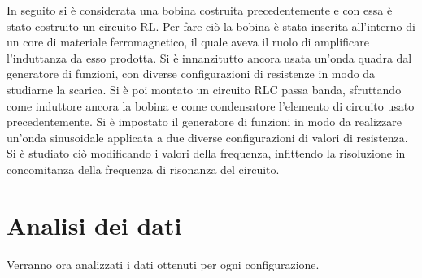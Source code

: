\documentclass{article}
\begin{document}
In seguito si è considerata una bobina costruita precedentemente e con essa è stato costruito un circuito RL. Per fare ciò la bobina è stata inserita all'interno di un core di materiale ferromagnetico, il quale aveva il ruolo di amplificare l'induttanza da esso prodotta. Si è innanzitutto ancora usata un'onda quadra dal generatore di funzioni, con diverse configurazioni di resistenze in modo da studiarne la scarica. Si è poi montato un circuito RLC passa banda, sfruttando come induttore ancora la bobina e come condensatore l'elemento di circuito usato precedentemente. Si è impostato il generatore di funzioni in modo da realizzare un'onda sinusoidale applicata a due diverse configurazioni di valori di resistenza. Si è studiato ciò modificando i valori della frequenza, infittendo la risoluzione in concomitanza della frequenza di risonanza del circuito. \\

\newpage

\section{Analisi dei dati}

Verranno ora analizzati i dati ottenuti per ogni configurazione.


\end{document}
